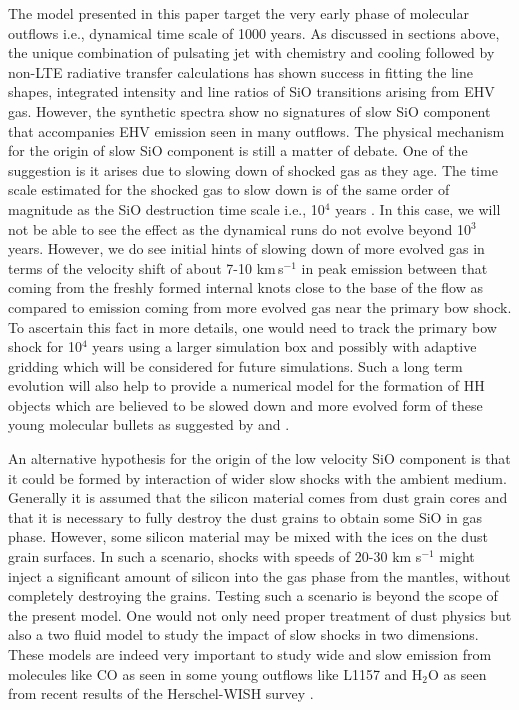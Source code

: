 \documentclass[useAMS,usenatbib]{mn2e}
\begin{document}
The model presented in this paper target the very early phase of molecular
outflows i.e., dynamical time scale of 1000 years.
As discussed in sections above, the unique combination of pulsating
jet with chemistry and cooling followed by non-LTE radiative transfer
calculations has shown success in fitting the line shapes, integrated intensity and line ratios of SiO
transitions arising from EHV gas. However, the synthetic spectra show
no signatures of slow SiO component that accompanies EHV emission seen
in many outflows. The physical mechanism for the origin of slow SiO component is still a matter
of debate. One of the suggestion is it arises due to slowing down of
shocked gas as they age. The time scale estimated for the shocked gas
to slow down is of the same order of magnitude as the SiO destruction
time scale i.e., 10$^{4}$ years \cite{Codella:1999p12584}. In this
case, we will not be able to see the effect as the dynamical runs do
not evolve beyond 10$^{3}$ years. However, we do see initial 
hints of slowing down of more evolved gas in terms of the velocity
shift of about 7-10 km\,s$^{-1}$ in peak emission between that
coming from the freshly formed internal knots close to the base of the
flow as compared to emission coming from more evolved gas near the
primary bow shock. To ascertain this fact in more details, one would
need to track the primary bow shock for 10$^{4}$ years
using a larger simulation box and possibly with adaptive gridding 
which will be considered for future simulations. Such a long term
evolution will also help to provide a numerical model for the formation of HH objects
which are believed to be slowed down and more evolved form of these
young molecular bullets as suggested by \cite{Norman:1979p14858} and
  \cite{Hartigan:1987p11178}.
%

An alternative hypothesis for the origin of the low velocity SiO
component is that it could be formed by interaction of wider slow
shocks with the ambient medium. Generally it is assumed that the silicon material comes from dust
grain cores and that it is necessary to fully destroy the dust grains
to obtain some SiO in gas phase. However, some silicon material may be
mixed with the ices on the dust grain surfaces. In such a scenario, 
shocks with speeds of 20-30 km s$^{-1}$ might inject a significant
amount of silicon into the gas phase from the mantles, without 
completely destroying the grains. Testing such a scenario is beyond
the scope of the present model. One would not only need proper
treatment of dust physics but also a two fluid model to study the impact
of slow shocks in two dimensions. These models are indeed very
important to study wide and slow emission from molecules like CO 
as seen in some young outflows like L1157 \cite{GomezRuiz:2013p14549}
and H$_{2}$O as seen from recent results of the Herschel-WISH survey
\cite{Tafalla:2013p12586}.
\end{document}
